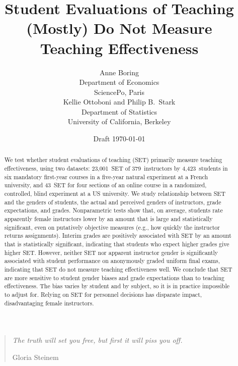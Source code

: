 \documentclass[12pt]{article}
\title{Student Evaluations of Teaching (Mostly) Do Not Measure Teaching Effectiveness}
\author{Anne Boring\\
Department of Economics\\SciencePo, Paris\\[.2in]
Kellie Ottoboni and Philip B.~Stark\\
Department of Statistics\\
University of California, Berkeley}
\date{Draft \today}
\begin{document}
\maketitle

\newpage
\begin{quotation}
    \emph{The truth will set you free, but first it will piss you off.}
    
     \hfill Gloria Steinem
\end{quotation}

\begin{abstract}

We test whether student evaluations of teaching (SET) 
primarily measure teaching effectiveness, using 
two datasets:
23,001~SET of 379~instructors by 4,423~students in six 
mandatory first-year courses in a five-year natural experiment at a French university, 
and
43~SET for four sections of an online course in a randomized, controlled, 
blind experiment at a US university.
We study relationship between SET and the genders of students, the actual and
perceived genders of instructors, grade expectations, and grades.
Nonparametric tests show that, on average, students rate apparently female instructors lower 
by an amount that is 
large and statistically significant, even on putatively objective measures (e.g., how
quickly the instructor returns assignments).
Interim grades are positively associated with SET
by an amount that is statistically significant, indicating that students who expect
higher grades give higher SET.
However, neither SET nor apparent instructor gender is significantly associated 
with student performance on anonymously graded uniform final exams, indicating
that SET do not measure teaching effectiveness well. 
We conclude that SET are more sensitive to student gender biases and grade 
expectations than to teaching effectiveness.
The bias varies by student and by subject, so it is in practice impossible to adjust for. 
Relying on SET for personnel decisions has disparate impact, disadvantaging 
female instructors.




\end{abstract}
\end{document}
